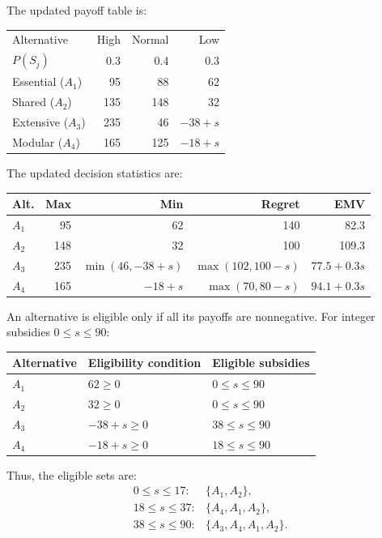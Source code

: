 The updated payoff table is:

\begin{center}\small\setlength{\tabcolsep}{4pt}
	\begin{tabular}{lrrr}\toprule
		Alternative & High & Normal & Low\\
		$P(S_j)$ & 0.3 & 0.4 & 0.3\\ \midrule
				Essential ($A_1$) & 95 & 88 & 62\\
		Shared ($A_2$) & 135 & 148 & 32\\
		Extensive ($A_3$) & 235 & 46 & $-38+s$\\
		Modular ($A_4$) & 165 & 125 & $-18+s$\\
		\bottomrule
	\end{tabular}
\end{center}

The updated decision statistics are:

\begin{center}\small\setlength{\tabcolsep}{4pt}
	\begin{tabular}{lrrrr}\toprule
		Alt. & Max & Min & Regret & EMV\\ \midrule
				$A_1$ & 95 & 62 & 140 & 82.3\\
		$A_2$ & 148 & 32 & 100 & 109.3\\
		$A_3$ & 235 & $\min(46,-38+s)$ & $\max(102,100-s)$ & $77.5+0.3s$\\
		$A_4$ & 165 & $-18+s$ & $\max(70,80-s)$ & $94.1+0.3s$\\
		\bottomrule
	\end{tabular}
\end{center}

An alternative is eligible only if all its payoffs are nonnegative.
For integer subsidies $0\le s\le90$:

\begin{center}
\begin{tabular}{lll}\toprule
Alternative & Eligibility condition & Eligible subsidies\\\midrule
$A_1$ & $62\ge0$ & $0\le s\le90$\\
$A_2$ & $32\ge0$ & $0\le s\le90$\\
$A_3$ & $-38+s\ge0$ & $38\le s\le90$\\
$A_4$ & $-18+s\ge0$ & $18\le s\le90$\\
\bottomrule
\end{tabular}
\end{center}

Thus, the eligible sets are:
\[
\begin{array}{ll}
0\le s\le17: & \{A_1,A_2\},\\
18\le s\le37: & \{A_4,A_1,A_2\},\\
38\le s\le90: & \{A_3,A_4,A_1,A_2\}.
\end{array}
\]

